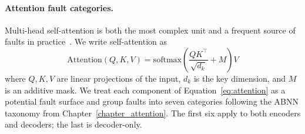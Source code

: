 \paragraph{Attention fault categories.}
Multi-head self-attention is both the most complex unit and a frequent source of faults in practice~\citep{ABNN_sigma,michel2019sixteen,voita2019analyzing}. We write self-attention as
\begin{equation}
\mathrm{Attention}(Q, K, V) = \mathrm{softmax}\!\left(\frac{QK^\top}{\sqrt{d_k}} + M\right)V
\label{eq:attention}
\end{equation}
where $Q, K, V$ are linear projections of the input, $d_k$ is the key dimension, and $M$ is an additive mask.
We treat each component of Equation~\ref{eq:attention} as a potential fault surface and group faults into seven categories following the ABNN taxonomy from Chapter~\ref{chapter_attention}. The first six apply to both encoders and decoders; the last is decoder-only.

